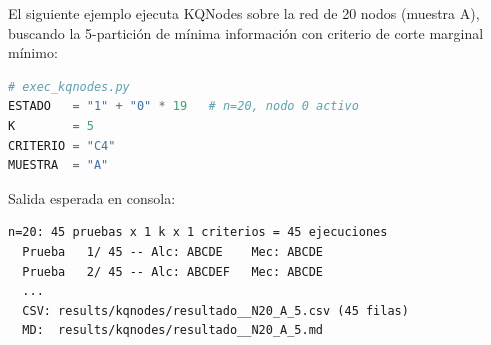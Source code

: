 El siguiente ejemplo ejecuta KQNodes sobre la red de 20 nodos (muestra A),
buscando la 5-partición de mínima información con criterio de corte marginal mínimo:

\begin{lstlisting}[language=Python]
# exec_kqnodes.py
ESTADO   = "1" + "0" * 19   # n=20, nodo 0 activo
K        = 5
CRITERIO = "C4"
MUESTRA  = "A"
\end{lstlisting}

Salida esperada en consola:

\begin{lstlisting}
n=20: 45 pruebas x 1 k x 1 criterios = 45 ejecuciones
  Prueba   1/ 45 -- Alc: ABCDE    Mec: ABCDE
  Prueba   2/ 45 -- Alc: ABCDEF   Mec: ABCDE
  ...
  CSV: results/kqnodes/resultado__N20_A_5.csv (45 filas)
  MD:  results/kqnodes/resultado__N20_A_5.md
\end{lstlisting}

